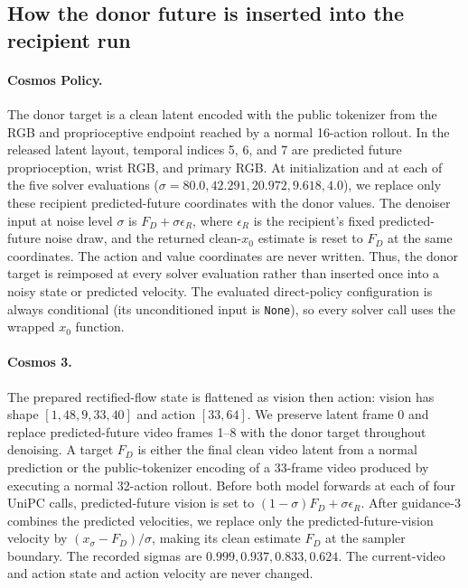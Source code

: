 \documentclass{article}
\begin{document}
\subsection{How the donor future is inserted into the recipient run}
\label{app:future_replacement_impl}

\paragraph{Cosmos Policy.}
The donor target is a clean latent encoded with the public tokenizer from the RGB and proprioceptive endpoint reached by a normal 16-action rollout. In the released latent layout, temporal indices 5, 6, and 7 are predicted future proprioception, wrist RGB, and primary RGB. At initialization and at each of the five solver evaluations ($\sigma=80.0,42.291,20.972,9.618,4.0$), we replace only these recipient predicted-future coordinates with the donor values. The denoiser input at noise level $\sigma$ is $F_D+\sigma\epsilon_R$, where $\epsilon_R$ is the recipient's fixed predicted-future noise draw, and the returned clean-$x_0$ estimate is reset to $F_D$ at the same coordinates. The action and value coordinates are never written. Thus, the donor target is reimposed at every solver evaluation rather than inserted once into a noisy state or predicted velocity. The evaluated direct-policy configuration is always conditional (its unconditioned input is \texttt{None}), so every solver call uses the wrapped $x_0$ function.

\paragraph{Cosmos 3.}
The prepared rectified-flow state is flattened as vision then action: vision has shape $[1,48,9,33,40]$ and action $[33,64]$. We preserve latent frame 0 and replace predicted-future video frames 1--8 with the donor target throughout denoising. A target $F_D$ is either the final clean video latent from a normal prediction or the public-tokenizer encoding of a 33-frame video produced by executing a normal 32-action rollout. Before both model forwards at each of four UniPC calls, predicted-future vision is set to $(1-\sigma)F_D+\sigma\epsilon_R$. After guidance-3 combines the predicted velocities, we replace only the predicted-future-vision velocity by $(x_\sigma-F_D)/\sigma$, making its clean estimate $F_D$ at the sampler boundary. The recorded sigmas are $0.999,0.937,0.833,0.624$. The current-video and action state and action velocity are never changed.
\end{document}
